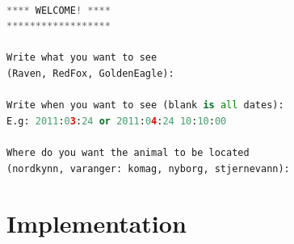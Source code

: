 \documentclass[USenglish]{uit-thesis}
\begin{document}
\begin{lstlisting}[frame=single,caption={Main menu },label={lst:mainmenu}, language=Python]

**** WELCOME! ****
******************

Write what you want to see
(Raven, RedFox, GoldenEagle): 

Write when you want to see (blank is all dates): 
E.g: 2011:03:24 or 2011:04:24 10:10:00

Where do you want the animal to be located
(nordkynn, varanger: komag, nyborg, stjernevann):
\end{lstlisting}

\chapter{Implementation}
\end{document}
